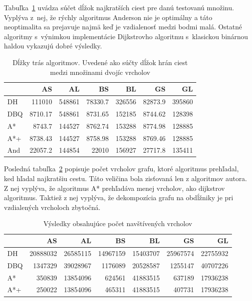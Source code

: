 Tabuľka~\ref{fig:totalpath_result} uvádza súčet dĺžok najkratších ciest pre danú testovanú množinu. Vyplýva z~nej, že rýchly algoritmus Anderson nie je optimálny a táto neoptimalita sa prejavuje najmä keď je vzdialenosť medzi bodmi malá. Ostatné algoritmy s~výnimkou implementácie Dijkstrovho algoritmu s~klasickou binárnou haldou vykazujú dobré výsledky.
\begin{table}[H]
	\centering
	\begin{tabular}{|l | r|r|r|r|r|r|}
	\hline
	 & AS & AL & BS & BL & GS & GL \\
	\hline
	DH & 111010 & 548861 & 78330.7& 326556 & 82873.9 & 395860 \\
	DBQ & 8710.17 & 548861 & 8731.65 & 152185 & 8744.62 & 128398 \\
	A* & 8743.7 & 144527& 8762.74 & 153288 & 8774.98 & 128885 \\
	A*+ & 8738.43& 144527 & 8758.98 & 153288 & 8769.46 & 128885 \\
	And & 22057.2 & 144854 & 22010 & 156927 & 27717.8 & 135411 \\
	\hline
	\end{tabular}
	\caption{Dĺžky trás algoritmov. Uvedené ako súčty dĺžok hrán ciest medzi množinami dvojíc vrcholov}
	\label{fig:totalpath_result}
\end{table}

Posledná tabuľka~\ref{fig:verticesscanned_result} popisuje
počet vrcholov grafu, ktoré algoritmus prehľadal, ked hľadal najkratšiu cestu. Táto veličina bola zisťovaná len z algoritmov autora. Z nej vyplýva, že algoritmus A* prehľadáva menej vrcholov, ako dijkstrov algoritmus. Taktiež z nej vyplýva, že dekompozícia grafu na obdĺžniky je pri vzdialených vrcholoch zbytočná.
\begin{table}[H]
	\centering
	
	\begin{tabular}{|l | r|r|r|r|r|r|}
		\hline
		  & AS & AL & BS & BL & GS & GL \\
		\hline
		DH & 20888032 & 26585115 & 14967159 & 15403707 & 25967574 & 22755932 \\
		DBQ & 1347329 & 39028967 & 1176089 & 20528587 & 1255147 & 40707226 \\
		A* & 350839 & 13854096& 624561 & 41883515 & 637189 & 17936238 \\
		A*+ & 250022& 13854096 & 465311 & 41883515 & 407731 & 17936238 \\

		\hline
	\end{tabular}
		
	\caption{Výsledky obsahujúce počet navštívených vrcholov}
	\label{fig:verticesscanned_result}
\end{table}


